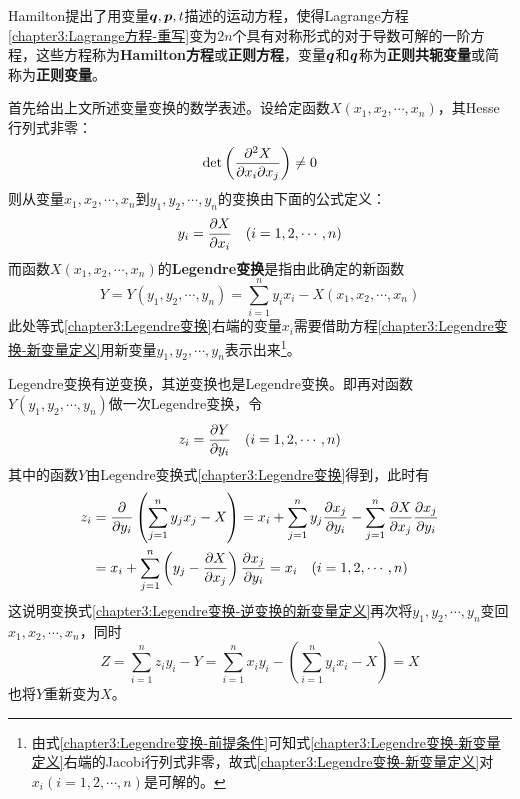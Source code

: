Hamilton提出了用变量$\boldsymbol{q},\boldsymbol{p},t$描述的运动方程，使得Lagrange方程\eqref{chapter3:Lagrange方程-重写}变为$2n$个具有对称形式的对于导数可解的一阶方程，这些方程称为{\bf Hamilton方程}或{\bf 正则方程}，变量$\boldsymbol{q}$和$\boldsymbol{q}$称为{\bf 正则共轭变量}或简称为{\bf 正则变量}。

首先给出上文所述变量变换的数学表述。设给定函数$X(x_1,x_2,\cdots,x_n)$，其Hesse行列式非零：
\begin{equation}
	\det\begin{pmatrix} \dfrac{\partial^2 X}{\partial x_i\partial x_j}\end{pmatrix} \neq 0
	\label{chapter3:Legendre变换-前提条件}
\end{equation}
则从变量$x_1,x_2,\cdots,x_n$到$y_1,y_2,\cdots,y_n$的变换由下面的公式定义：
\begin{equation}
	y_i = \frac{\partial X}{\partial x_i} \quad (i=1,2,\cdots,n)
	\label{chapter3:Legendre变换-新变量定义}
\end{equation}
而函数$X(x_1,x_2,\cdots,x_n)$的{\bf Legendre变换}是指由此确定的新函数
\begin{equation}
	Y = Y(y_1,y_2,\cdots,y_n) = \sum_{i=1}^n y_ix_i - X(x_1,x_2,\cdots,x_n)
	\label{chapter3:Legendre变换}
\end{equation}
此处等式\eqref{chapter3:Legendre变换}右端的变量$x_i$需要借助方程\eqref{chapter3:Legendre变换-新变量定义}用新变量$y_1,y_2,\cdots,y_n$表示出来\footnote{由式\eqref{chapter3:Legendre变换-前提条件}可知式\eqref{chapter3:Legendre变换-新变量定义}右端的Jacobi行列式非零，故式\eqref{chapter3:Legendre变换-新变量定义}对$x_i(i=1,2,\cdots,n)$是可解的。}。

Legendre变换有逆变换，其逆变换也是Legendre变换。即再对函数$Y(y_1,y_2,\cdots,y_n)$做一次Legendre变换，令
\begin{equation}
	z_i = \frac{\partial Y}{\partial y_i}\quad (i=1,2,\cdots,n)
	\label{chapter3:Legendre变换-逆变换的新变量定义}
\end{equation}
其中的函数$Y$由Legendre变换式\eqref{chapter3:Legendre变换}得到，此时有
\begin{align*}
	z_i & = \frac{\partial}{\partial y_i}\left(\sum_{j=1}^n y_jx_j - X\right) = x_i + \sum_{j=1}^n y_j\frac{\partial x_j}{\partial y_i} - \sum_{j=1}^n \frac{\partial X}{\partial x_j} \frac{\partial x_j}{\partial y_i} \\
	& = x_i + \sum_{j=1}^n \left(y_j-\frac{\partial X}{\partial x_j}\right) \frac{\partial x_j}{\partial y_i} = x_i \quad (i=1,2,\cdots,n)
\end{align*}
这说明变换式\eqref{chapter3:Legendre变换-逆变换的新变量定义}再次将$y_1,y_2,\cdots,y_n$变回$x_1,x_2,\cdots,x_n$，同时
\begin{equation}
	Z = \sum_{i=1}^n z_iy_i - Y = \sum_{i=1}^n x_iy_i - \left(\sum_{i=1}^n y_ix_i - X\right) = X
\end{equation}
也将$Y$重新变为$X$。

